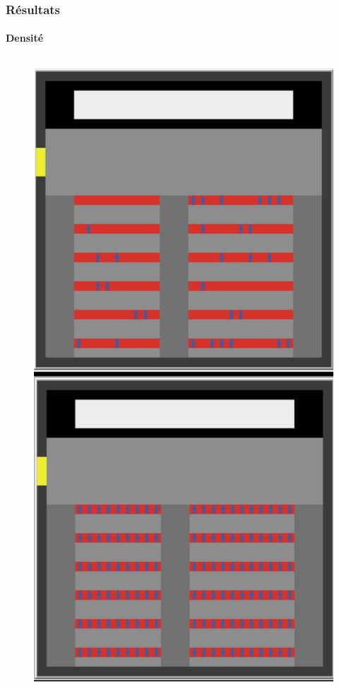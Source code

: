 \documentclass[10pt]{beamer}
\begin{document}
\begin{frame}
	\frametitle{\textbf {\Large Résultats}}
	\framesubtitle{\normalsize Densité}
	\begin{columns}

			\begin{figure}
				\includegraphics[scale = 0.35]{capture_densite.PNG}
 		

\end{figure}
\end{columns}
\end{frame}
\end{document}
